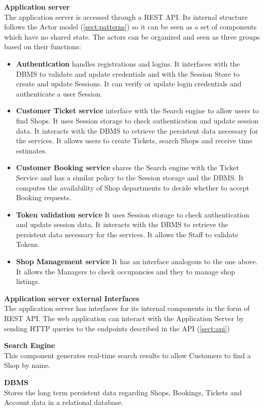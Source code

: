 \textbf{Application server}\\
The application server is accessed through a REST API. Its internal structure follows the Actor model (\ref{sect:patterns}) so it can be seen as a set of components which have no shared state. The actors can be organized and seen as three groups based on their functions:
\begin{itemize}
    \item \textbf{Authentication} handles registrations and logins. It interfaces with the DBMS to validate and update credentials and with the Session Store to create and update Sessions. It can verify or update login credentials and authenticate a user Session.
    \item \textbf{Customer Ticket service} interface with the Search engine to allow users to find Shops. It uses Session storage to check authentication and update session data. It interacts with the DBMS to retrieve the persistent data necessary for the services. It allows users to create Tickets, search Shops and receive time estimates.
    \item \textbf{Customer Booking service} shares the Search engine with the Ticket Service and has a similar policy to the Session storage and the DBMS. It computes the availability of Shop departments to decide whether to accept Booking requests.
    \item \textbf{Token validation service} It uses Session storage to check authentication and update session data. It interacts with the DBMS to retrieve the persistent data necessary for the services. It allows the Staff to validate Tokens. 
    \item \textbf{Shop Management service} It has an interface analogous to the one above. It allows the Managers to check occupancies and they to manage shop listings.

\end{itemize}
\textbf{Application server external Interfaces}\\
The application server has interfaces for its internal components in the form of REST API. The web application can interact with the Application Server by sending HTTP queries to the endpoints described in the API (\ref{sect:api})

\textbf{Search Engine}\\ This component generates real-time search results to allow Customers to find a Shop by name.

\textbf{DBMS}\\ Stores the long term persistent data regarding Shops, Bookings, Tickets and Account data in a relational database.


